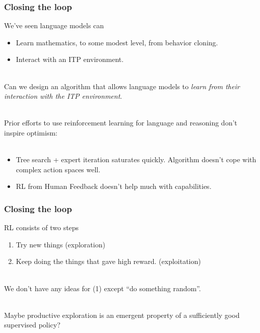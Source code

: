 \documentclass{beamer}
\begin{document}
\begin{frame}
\frametitle{Closing the loop}
We've seen language models can 
\begin{itemize}
    \item Learn mathematics, to some modest level, from behavior cloning.
    \item Interact with an ITP environment.\\~\
\end{itemize}
\pause
Can we design an algorithm that allows language models to {\it learn from their interaction with the ITP environment}.\\~\

\pause
Prior efforts to use reinforcement learning for language and reasoning don't inspire optimism:\\~\
\begin{itemize}
    \item Tree search + expert iteration saturates quickly. Algorithm doesn't cope with complex action spaces well. 
    \item RL from Human Feedback doesn't help much with capabilities.
\end{itemize}
\end{frame}

\begin{frame}
\frametitle{Closing the loop}
RL consists of two steps
\begin{enumerate}
    \item Try new things (exploration)
    \item Keep doing the things that gave high reward. (exploitation)\\~\
\end{enumerate}
We don't have any ideas for (1) except ``do something random''. \\~\

\pause
Maybe productive exploration is an emergent property of a sufficiently good supervised policy?
\end{frame}
\end{document}
